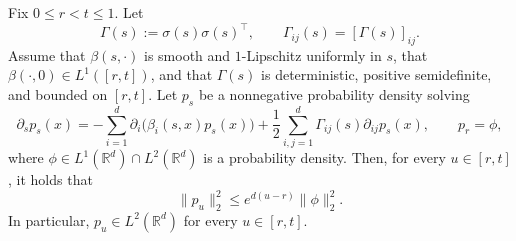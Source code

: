 \documentclass[10pt,a4paper]{amsart}
\begin{document}
\begin{lem}\label{lem:c2}
Fix $0 \le r < t \le 1$. Let
\[
\Gamma(s) := \sigma(s)\sigma(s)^\top, \qquad \Gamma_{ij}(s) = [\Gamma(s)]_{ij}.
\]
Assume that $\beta(s,\cdot)$ is smooth and $1$-Lipschitz uniformly in $s$,
that $\beta(\cdot,0)\in L^1([r,t])$, and that $\Gamma(s)$ is deterministic,
positive semidefinite, and bounded on $[r,t]$. Let $p_s$ be a nonnegative
probability density solving
\[
\partial_s p_s(x)
=
-\sum_{i=1}^d \partial_i\bigl(\beta_i(s,x)p_s(x)\bigr)
+
\frac12\sum_{i,j=1}^d \Gamma_{ij}(s)\partial_{ij}p_s(x),
\qquad p_r=\phi,
\]
where $\phi\in L^1(\mathbb R^d)\cap L^2(\mathbb R^d)$ is a probability density.
Then, for every $u\in[r,t]$, it holds that
\[
\|p_u\|_2^2
\le
e^{d(u-r)}\|\phi\|_2^2.
\]
In particular, $p_u\in L^2(\mathbb R^d)$ for every $u\in[r,t]$.
\end{lem}
\end{document}
